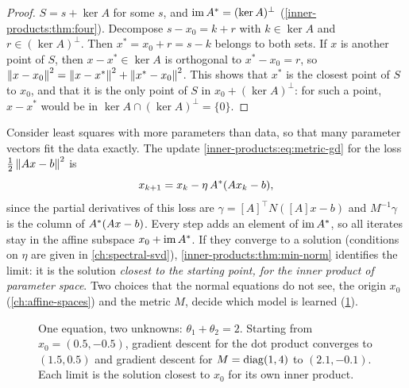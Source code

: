 \begin{notechapter}
\begin{proof}
$S = s + \ker A$ for some $s$, and $\operatorname{im}A^{*} = (\ker A)^\perp$
(\cref{inner-products:thm:four}). Decompose
$s - x_0 = k + r$ with $k\in\ker A$ and $r\in(\ker A)^\perp$. Then
$x^* = x_0 + r = s - k$ belongs to both sets. If $x$ is another point of
$S$, then $x - x^*\in\ker A$ is orthogonal to $x^* - x_0 = r$, so
$\left\|x - x_0\right\|^2 = \left\|x - x^*\right\|^2 + \left\|x^* - x_0\right\|^2$. This shows that
$x^*$ is the closest point of $S$ to $x_0$, and that it is the only point
of $S$ in $x_0 + (\ker A)^\perp$: for such a point, $x - x^*$ would be in
$\ker A\cap(\ker A)^\perp = \{0\}$.
\end{proof}

\begin{mlthread}
Consider least squares with more parameters than data, so that many
parameter vectors fit the data exactly. The update
\eqref{inner-products:eq:metric-gd} for the loss $\frac12\left\|Ax - b\right\|^2$
is
\[
  x_{k+1} = x_k - \eta\,A^{*}(Ax_k - b) ,
\]
since the partial derivatives of this loss are
$\gamma = [A]^\top N([A]x - b)$ and $M^{-1}\gamma$ is the column of
$A^{*}(Ax - b)$. Every step adds an element of $\operatorname{im}A^{*}$, so all
iterates stay in the affine subspace $x_0 + \operatorname{im}A^{*}$. If they converge
to a solution (conditions on $\eta$ are given in \cref{ch:spectral-svd}),
\cref{inner-products:thm:min-norm} identifies the limit: it is the
solution \emph{closest to the starting point, for the inner product of
parameter space}. Two choices that the normal equations do not see, the
origin $x_0$ (\cref{ch:affine-spaces}) and the metric $M$, decide which
model is learned (\cref{inner-products:fig:interpolators}).
\end{mlthread}

\begin{figure}[ht]
\centering
{}
\caption{One equation, two unknowns: $\theta_1 + \theta_2 = 2$. Starting
from $x_0 = (0.5, -0.5)$, gradient descent for the dot product converges
to $(1.5, 0.5)$ and gradient descent for $M = \operatorname{diag}(1, 4)$ to
$(2.1, -0.1)$. Each limit is the solution closest to $x_0$ for its own
inner product.}
\label{inner-products:fig:interpolators}
\end{figure}


\end{notechapter}
